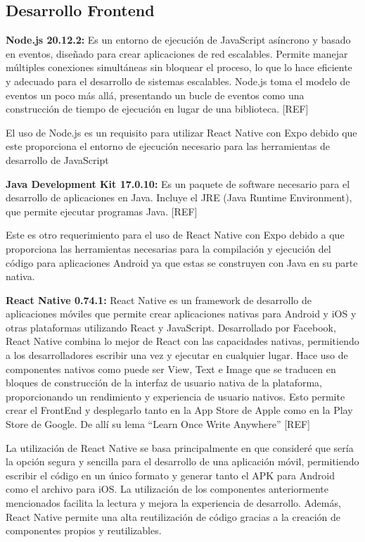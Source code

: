 \subsection{Desarrollo Frontend}

\textbf{Node.js 20.12.2:} Es un entorno de ejecución de JavaScript asíncrono y basado en eventos, diseñado para crear aplicaciones de red escalables. Permite manejar múltiples conexiones simultáneas sin bloquear el proceso, lo que lo hace eficiente y adecuado para el desarrollo de sistemas escalables. Node.js toma el modelo de eventos un poco más allá, presentando un bucle de eventos como una construcción de tiempo de ejecución en lugar de una biblioteca. [REF]

El uso de Node.js es un requisito para utilizar React Native con Expo debido que este proporciona el entorno de ejecución necesario para las herramientas de desarrollo de JavaScript

\textbf{Java Development Kit 17.0.10:} Es un paquete de software necesario para el desarrollo de aplicaciones en Java. Incluye el JRE (Java Runtime Environment), que permite ejecutar programas Java. [REF]

Este es otro requerimiento para el uso de React Native con Expo debido a que proporciona las herramientas necesarias para la compilación y ejecución del código para aplicaciones Android ya que estas se construyen con Java en su parte nativa.

\textbf{React Native 0.74.1:} React Native es un framework de desarrollo de aplicaciones móviles que permite crear aplicaciones nativas para Android y iOS y otras plataformas utilizando React y JavaScript. Desarrollado por Facebook, React Native combina lo mejor de React con las capacidades nativas, permitiendo a los desarrolladores escribir una vez y ejecutar en cualquier lugar. Hace uso de componentes nativos como puede ser View, Text e Image que se traducen en bloques de construcción de la interfaz de usuario nativa de la plataforma, proporcionando un rendimiento y experiencia de usuario nativos. Esto permite crear el FrontEnd y desplegarlo tanto en la App Store de Apple como en la Play Store de Google. De allí su lema “Learn Once Write Anywhere” [REF]

La utilización de React Native se basa principalmente en que consideré que sería la opción segura y sencilla para el desarrollo de una aplicación móvil, permitiendo escribir el código en un único formato y generar tanto el APK para Android como el archivo para iOS. La utilización de los componentes anteriormente mencionados facilita la lectura y mejora la experiencia de desarrollo. Además, React Native permite una alta reutilización de código gracias a la creación de componentes propios y reutilizables. 

